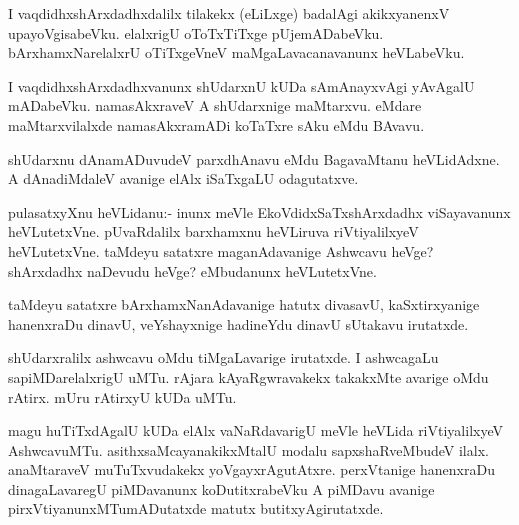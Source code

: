 \documentclass{article}
\begin{document}
\begin{mn}
I vaqdidhxshArxdadhxdalilx tilakekx (eLiLxge) badalAgi akikxyanenxV
upayoVgisabeVku. elalxrigU oToTxTiTxge
pUjemADabeVku. bArxhamxNarelalxrU oTiTxgeVneV maMgaLavacanavanunx heVLabeVku.
\end{mn}

\begin{mn}
I vaqdidhxshArxdadhxvanunx shUdarxnU kUDa sAmAnayxvAgi yAvAgalU
mADabeVku. namasAkxraveV A shUdarxnige maMtarxvu. eMdare
maMtarxvilalxde namasAkxramADi koTaTxre sAku eMdu BAvavu.
\end{mn}

\begin{mn}%
shUdarxnu dAnamADuvudeV parxdhAnavu eMdu BagavaMtanu heVLidAdxne. A
dAnadiMdaleV avanige elAlx iSaTxgaLU odagutatxve.
\end{mn}

%
%



\begin{mn}%
pulasatxyXnu heVLidanu:- inunx meVle EkoVdidxSaTxshArxdadhx
viSayavanunx heVLutetxVne. pUvaRdalilx barxhamxnu heVLiruva
riVtiyalilxyeV heVLutetxVne. taMdeyu satatxre maganAdavanige Ashwcavu
heVge? shArxdadhx naDevudu heVge? eMbudanunx heVLutetxVne.
\end{mn}

\begin{mn}
taMdeyu satatxre bArxhamxNanAdavanige hatutx divasavU, kaSxtirxyanige
hanenxraDu dinavU, veYshayxnige hadineYdu dinavU sUtakavu irutatxde.
\end{mn}

\begin{mn}
shUdarxralilx ashwcavu oMdu tiMgaLavarige irutatxde. I ashwcagaLu
sapiMDarelalxrigU uMTu. rAjara kAyaRgwravakekx takakxMte avarige oMdu
rAtirx. mUru rAtirxyU kUDa uMTu.
\end{mn}

\begin{mn}%
magu huTiTxdAgalU kUDa elAlx vaNaRdavarigU meVle heVLida
riVtiyalilxyeV AshwcavuMTu. asithxsaMcayanakikxMtalU modalu
sapxshaRveMbudeV ilalx. anaMtaraveV muTuTxvudakekx
yoVgayxrAgutAtxre. perxVtanige hanenxraDu dinagaLavaregU piMDavanunx
koDutitxrabeVku A piMDavu avanige pirxVtiyanunxMTumADutatxde matutx butitxyAgirutatxde.
\end{mn}
\end{document}
